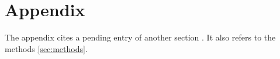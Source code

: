 \section*{Appendix}
The appendix cites a pending entry of another section \parencite{doeSurvey2021}.
It also refers to the methods \ref{sec:methods}.
